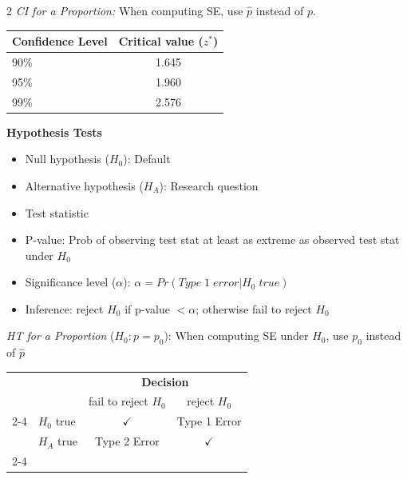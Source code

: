 \documentclass[8pt]{article}
\begin{document}
\begin{multicols}{2}
\textit{CI for a Proportion:} When computing SE, use $\hat{p}$ instead of $p$.

\begin{center}
\begin{tabular}{|l|c|}
\hline
\textbf{Confidence Level} & \textbf{Critical value }($z^*$) \\
\hline
90\% & 1.645 \\
95\% & 1.960 \\
99\% & 2.576 \\
\hline
\end{tabular}

\end{center}

\vspace{1em}

\textbf{Hypothesis Tests}

\begin{itemize}
    \item Null hypothesis ($H_0$): Default
    \item Alternative hypothesis ($H_A$): Research question
    \item Test statistic
    \item P-value: Prob of observing test stat at least as extreme as observed test stat under $H_0$
    \item Significance level ($\alpha$): $\alpha=Pr(Type\; 1\; error | H_0\; true)$
    \item Inference: reject $H_0$ if p-value $< \alpha$; otherwise fail to reject $H_0$
\end{itemize}

\textit{HT for a Proportion} ($H_0: p = p_0$):
When computing SE under $H_0$, use $p_0$ instead of $\hat{p}$

\begin{center}
\begin{tabular}{l l | c c}
\multicolumn{2}{c}{} & \multicolumn{2}{c}{\textbf{Decision}} \\
& & fail to reject $H_0$ &  reject $H_0$ \\
  \cline{2-4}
& $H_0$ true & $\checkmark$ &  Type 1 Error \\
\raisebox{1.5ex}{\textbf{Truth}} & $H_A$ true & Type 2 Error & $\checkmark$ \\
  \cline{2-4}
\end{tabular}
\end{center}


\end{multicols} %
\end{document}
